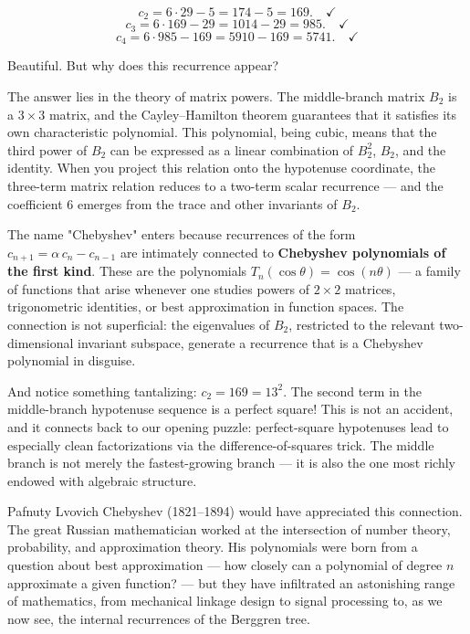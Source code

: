 \documentclass[11pt,openright,twoside]{book}
\theoremstyle{definition}
\begin{document}
\[c_2 = 6 \cdot 29 - 5 = 174 - 5 = 169. \quad \checkmark\]
\[c_3 = 6 \cdot 169 - 29 = 1014 - 29 = 985. \quad \checkmark\]
\[c_4 = 6 \cdot 985 - 169 = 5910 - 169 = 5741. \quad \checkmark\]

Beautiful. But why does this recurrence appear?

The answer lies in the theory of matrix powers. The middle-branch matrix $B_2$ is a $3 \times 3$ matrix, and the Cayley--Hamilton theorem guarantees that it satisfies its own characteristic polynomial. This polynomial, being cubic, means that the third power of $B_2$ can be expressed as a linear combination of $B_2^2$, $B_2$, and the identity. When you project this relation onto the hypotenuse coordinate, the three-term matrix relation reduces to a two-term scalar recurrence --- and the coefficient $6$ emerges from the trace and other invariants of $B_2$.

The name "Chebyshev" enters because recurrences of the form $c_{n+1} = \alpha \, c_n - c_{n-1}$ are intimately connected to \textbf{Chebyshev polynomials of the first kind}. These are the polynomials $T_n(\cos\theta) = \cos(n\theta)$ --- a family of functions that arise whenever one studies powers of $2 \times 2$ matrices, trigonometric identities, or best approximation in function spaces. The connection is not superficial: the eigenvalues of $B_2$, restricted to the relevant two-dimensional invariant subspace, generate a recurrence that is a Chebyshev polynomial in disguise.

And notice something tantalizing: $c_2 = 169 = 13^2$. The second term in the middle-branch hypotenuse sequence is a perfect square! This is not an accident, and it connects back to our opening puzzle: perfect-square hypotenuses lead to especially clean factorizations via the difference-of-squares trick. The middle branch is not merely the fastest-growing branch --- it is also the one most richly endowed with algebraic structure.

Pafnuty Lvovich Chebyshev (1821--1894) would have appreciated this connection. The great Russian mathematician worked at the intersection of number theory, probability, and approximation theory. His polynomials were born from a question about best approximation --- how closely can a polynomial of degree $n$ approximate a given function? --- but they have infiltrated an astonishing range of mathematics, from mechanical linkage design to signal processing to, as we now see, the internal recurrences of the Berggren tree.
\end{document}
